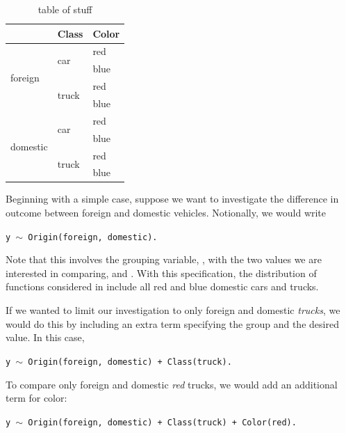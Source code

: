 \begin{table}
\centering
\def\arraystretch{1.5}
\begin{tabular}{|p{0.9in}|p{0.9in}|p{0.9in}|} \hline 
\rowcolor{lightgray} \multicolumn{1}{|c|}{Origin} & \multicolumn{1}{c|}{Class} & \multicolumn{1}{c|}{Color}\\
\hline
\multirow{4}{*}{foreign} & \multirow{2}{*}{car} & red \\
\hhline{~~-}
& & blue \\
\hhline{~--}
& \multirow{2}{*}{truck} & red \\
\hhline{~~-}
& & blue \\
\hline
\multirow{4}{*}{domestic} & \multirow{2}{*}{car} & red \\
\hhline{~~-}
& & blue \\
\hhline{~--}
& \multirow{2}{*}{truck} & red \\
\hhline{~~-}
& & blue \\
\hline
\end{tabular}
\caption{table of stuff}
\label{tab:group_table}
\end{table}


Beginning with a simple case, suppose we want to investigate the difference in outcome between foreign and domestic vehicles. Notionally, we would write

\begin{center}
\tt y $\sim$ Origin(foreign, domestic).
\end{center}


Note that this involves the grouping variable, , with the two values we are interested in comparing,  and . With this specification, the distribution of functions considered in  include all red and blue domestic cars and trucks.


If we wanted to limit our investigation to only foreign and domestic \textit{trucks}, we would do this by including an extra term specifying the group and the desired value. In this case, 

\begin{center}
\tt y $\sim$ Origin(foreign, domestic) + Class(truck).
\end{center}
To compare only foreign and domestic \textit{red} trucks, we would add an additional term for color:

\begin{center}
\tt y $\sim$ Origin(foreign, domestic) + Class(truck) + Color(red).
\end{center}

